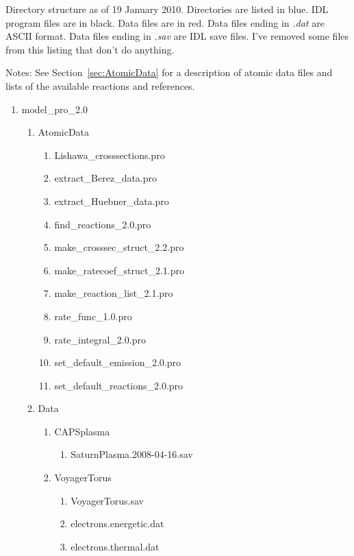 \documentclass[11pt]{article}
\begin{document}
Directory structure as of 19 January 2010. Directories are listed in blue. IDL
program files are in black. Data files are in red. Data files ending in 
\textit{.dat} are ASCII format. Data files ending in \textit{.sav} are IDL save 
files. I've removed some files from this listing that don't do anything.

Notes: See Section~\ref{sec:AtomicData} for a description of atomic data files 
and lists of the available reactions and references.

\begin{enumerate}
\item {\color{blue}model\_pro\_2.0}
  \begin{enumerate}
  \item {\color{blue}AtomicData}
    \begin{enumerate}
      \item Lishawa\_crosssections.pro
      \item extract\_Berez\_data.pro
      \item extract\_Huebner\_data.pro
      \item find\_reactions\_2.0.pro
      \item make\_crosssec\_struct\_2.2.pro
      \item make\_ratecoef\_struct\_2.1.pro
      \item make\_reaction\_list\_2.1.pro
      \item rate\_func\_1.0.pro
      \item rate\_integral\_2.0.pro
      \item set\_default\_emission\_2.0.pro
      \item set\_default\_reactions\_2.0.pro
      \end{enumerate}
  \item {\color{blue}Data}
    \begin{enumerate}
    \item {\color{blue}CAPSplasma}
      \begin{enumerate}
      \item {\color{red}SaturnPlasma.2008-04-16.sav}
      \end{enumerate}
    \item {\color{blue}VoyagerTorus}
      \begin{enumerate}
      \item {\color{red}VoyagerTorus.sav}
      \item {\color{red}electrons.energetic.dat}
      \item {\color{red}electrons.thermal.dat}

\end{enumerate}
\end{enumerate}
\end{enumerate}
\end{enumerate}
\end{document}
